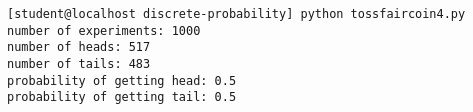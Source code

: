 {\footnotesize \begin{Verbatim}[frame=single,fontsize=\small]
[student@localhost discrete-probability] python tossfaircoin4.py
number of experiments: 1000
number of heads: 517
number of tails: 483
probability of getting head: 0.5
probability of getting tail: 0.5
\end{Verbatim}
}

